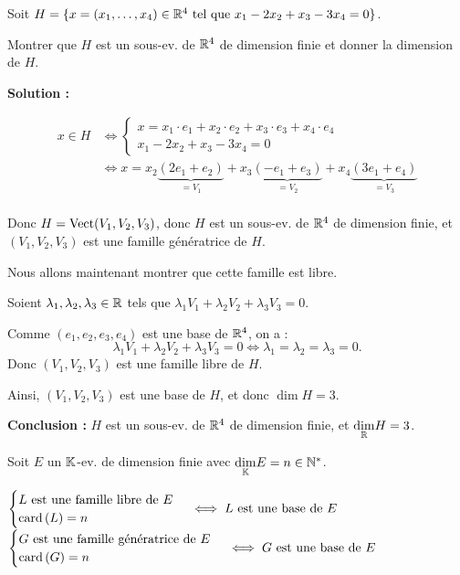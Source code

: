 \documentclass[12pt, a4paper]{report}
\begin{document}
\begin{exercise}
    Soit $H = \{x = (x_1,\dots,x_4) \in \mathbb{R}^4 \text{ tel que } x_1 - 2x_2 + x_3 - 3x_4 = 0\}$.

    Montrer que $H$ est un sous-ev. de $\mathbb{R}^4$ de dimension finie et donner la dimension de $H$.

    \textbf{Solution :}

    \begin{align*}
        x \in H &\iff \begin{cases}
        x = x_1 \cdot e_1 + x_2 \cdot e_2 + x_3 \cdot e_3 + x_4 \cdot e_4\\
        x_1 - 2x_2 + x_3 - 3x_4 = 0
        \end{cases}\\
        &\iff x = x_2\underbrace{(2e_1 + e_2)}_{=V_1} + x_3\underbrace{(-e_1 + e_3)}_{=V_2} + x_4\underbrace{(3e_1 + e_4)}_{=V_3}\\
    \end{align*}

    Donc $H = \mathrm{Vect}(V_1,V_2,V_3)$, donc $H$ est un sous-ev. de $\mathbb{R}^4$ de dimension finie, et $(V_1,V_2,V_3)$ est une famille génératrice de $H$.

    Nous allons maintenant montrer que cette famille est libre.

    Soient $\lambda_1,\lambda_2,\lambda_3 \in \mathbb{R}$ tels que $\lambda_1 V_1 + \lambda_2 V_2 + \lambda_3 V_3 = 0$.

    Comme $(e_1,e_2,e_3,e_4)$ est une base de $\mathbb{R}^4$, on a :
    $$\lambda_1 V_1 + \lambda_2 V_2 + \lambda_3 V_3 = 0 \iff \lambda_1 = \lambda_2 = \lambda_3 = 0.$$
    Donc $(V_1,V_2,V_3)$ est une famille libre de $H$.

    Ainsi, $(V_1,V_2,V_3)$ est une base de $H$, et donc $\dim H = 3$.

    \textbf{Conclusion :} $H$ est un sous-ev. de $\mathbb{R}^4$ de dimension finie, et $\underset{\mathbb{R}}\dim H = 3$.
\end{exercise}

\begin{property}
    Soit $E$ un $\mathbb{K}$-ev. de dimension finie avec $\underset{\mathbb{K}}\dim E = n \in \mathbb{N}^*$.

    \begin{outline}[enumerate]
        \1 $\begin{cases}
        L \text{ est une famille libre de } E \\
        \mathrm{card}\left(L\right) = n
        \end{cases} \iff L \text{ est une base de } E$
        \1 $\begin{cases}
        G \text{ est une famille génératrice de } E \\
        \mathrm{card}\left(G\right) = n
        \end{cases} \iff G \text{ est une base de } E$
    \end{outline}

    \label{prop:base_iff_libre_card_dim}
\end{property}
\end{document}
